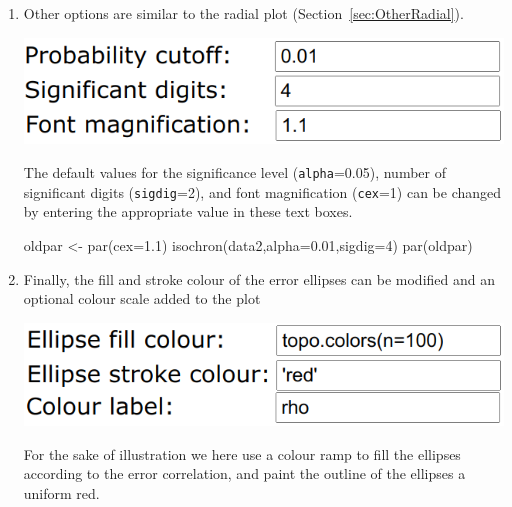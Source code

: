 \begin{refsection}
\begin{enumerate}
\item Other options are similar to the radial plot
  (Section~\ref{sec:OtherRadial}).

\noindent\begin{minipage}[t]{.45\linewidth}
  \strut\vspace*{-\baselineskip}\newline
  \includegraphics[width=\linewidth]{../figures/OtherRegressionAlpha.png}
\end{minipage}
\begin{minipage}[t]{.55\linewidth}
  The default values for the significance level (\texttt{alpha}=0.05),
  number of significant digits (\texttt{sigdig}=2), and font
  magnification (\texttt{cex}=1) can be changed by entering the
  appropriate value in these text boxes.
\end{minipage}

\begin{script}
oldpar <- par(cex=1.1)
isochron(data2,alpha=0.01,sigdig=4)
par(oldpar)
\end{script}

\item Finally, the fill and stroke colour of the error ellipses can be
  modified and an optional colour scale added to the plot

\noindent\begin{minipage}[t]{.45\linewidth}
  \strut\vspace*{-\baselineskip}\newline
  \includegraphics[width=\linewidth]{../figures/OtherRegressionFillStroke.png}
\end{minipage}
\begin{minipage}[t]{.55\linewidth}
For the sake of illustration we here use a colour ramp to fill the
ellipses according to the error correlation, and paint the outline of
the ellipses a uniform red.
\end{minipage}


\end{enumerate}
\end{refsection}
